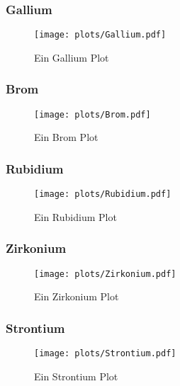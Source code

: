 \subsubsection{Gallium}
\begin{figure}
    \centering
    \texttt{[image: plots/Gallium.pdf]}
    \caption{Ein Gallium Plot}
    \label{fig:Gallium}
\end{figure}

\subsubsection{Brom}
\begin{figure}
    \centering
    \texttt{[image: plots/Brom.pdf]}
    \caption{Ein Brom Plot}
    \label{fig:Brom}
\end{figure}

\subsubsection{Rubidium}
\begin{figure}
    \centering
    \texttt{[image: plots/Rubidium.pdf]}
    \caption{Ein Rubidium Plot}
    \label{fig:Rubidium}
\end{figure}

\subsubsection{Zirkonium}
\begin{figure}
    \centering
    \texttt{[image: plots/Zirkonium.pdf]}
    \caption{Ein Zirkonium Plot}
    \label{fig:Zirkonium}
\end{figure}

\subsubsection{Strontium}
\begin{figure}
    \centering
    \texttt{[image: plots/Strontium.pdf]}
    \caption{Ein Strontium Plot}
    \label{fig:Strontium}
\end{figure}

